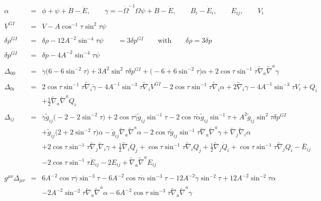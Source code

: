 \documentclass[10pt,letterpaper]{article}
\numberwithin{equation}{section}
\begin{document}
\begin{eqnarray}
\alpha  &=& \phi + \psi + \dot B - \ddot E,\qquad \gamma = - \dot\Omega^{-1}\Omega \psi + B - \dot E,
\qquad B_i - \dot E_i,\qquad E_{ij},\qquad V_i
\\ \nonumber\\
V^{GI} &=&V -  A\cos^{-1}\tau \sin^2\tau \psi 
\\ \nonumber\\
\delta \rho^{GI}&=&\delta \rho - 12 A^{-2} \sin^{-4}\tau \psi \qquad= 3\delta p^{GI}\qquad \text{with}\qquad \delta\rho=3\delta p
\\ \nonumber\\ 
\delta p^{GI}&=&\delta p  - 4 A^{-2}\sin^{-4}\tau \psi 
\\ \nonumber\\
\Delta_{00}&=& \dot{\gamma} \bigl(6 - 6 \sin^{-2}\tau\bigr) + 3 A^2 \sin^2\tau \delta p^{GI}{} + \bigl(-6 + 6 \sin^{-2}\tau\bigr) \alpha + 2 \cos\tau \sin^{-1}\tau \tilde{\nabla}_{a}\tilde{\nabla}^{a}\gamma 
\\  \nonumber\\ 
\Delta_{0i}&=& 2 \cos\tau \sin^{-1}\tau \tilde{\nabla}_{i}\dot{\gamma} - 4 A^{-1} \sin^{-3}\tau \tilde{\nabla}_{i}V^{GI}{} - 2 \cos\tau \sin^{-1}\tau \tilde{\nabla}_{i}\alpha + 2 \tilde{\nabla}_{i}\gamma -4 A^{-1} \sin^{-3}\tau V_{i} + Q_{i} \nonumber \\ 
&& + \tfrac{1}{2} \tilde{\nabla}_{a}\tilde{\nabla}^{a}Q_{i}
\\  \nonumber\\ 
\Delta_{ij}&=& \dot{\gamma} \tilde{g}_{ij} \bigl(-2 - 2 \sin^{-2}\tau\bigr) + 2 \cos\tau \overset{..}{\gamma} \tilde{g}_{ij} \sin^{-1}\tau - 2 \cos\tau \dot{\alpha} \tilde{g}_{ij} \sin^{-1}\tau + A^2 \tilde{g}_{ij} \sin^2\tau \delta p^{GI}{} \nonumber \\ 
&& + \tilde{g}_{ij} \bigl(2 + 2 \sin^{-2}\tau\bigr) \alpha -  \tilde{g}_{ij} \tilde{\nabla}_{a}\tilde{\nabla}^{a}\alpha - 2 \cos\tau \tilde{g}_{ij} \sin^{-1}\tau \tilde{\nabla}_{a}\tilde{\nabla}^{a}\gamma + \tilde{\nabla}_{j}\tilde{\nabla}_{i}\alpha \nonumber \\ 
&& + 2 \cos\tau \sin^{-1}\tau \tilde{\nabla}_{j}\tilde{\nabla}_{i}\gamma +\tfrac{1}{2} \tilde{\nabla}_{i}\dot{Q}_{j} + \cos\tau \sin^{-1}\tau \tilde{\nabla}_{i}Q_{j} + \tfrac{1}{2} \tilde{\nabla}_{j}\dot{Q}_{i} + \cos\tau \sin^{-1}\tau \tilde{\nabla}_{j}Q_{i}- \overset{..}{E}_{ij} \nonumber \\ 
&& - 2 \cos\tau \sin^{-1}\tau \dot{E}_{ij} - 2 E_{ij} + \tilde{\nabla}_{a}\tilde{\nabla}^{a}E_{ij}
\\  \nonumber\\ 
g^{\mu\nu}\Delta_{\mu\nu}&=& 6 A^{-2} \cos\tau \overset{..}{\gamma} \sin^{-3}\tau - 6 A^{-2} \cos\tau \dot{\alpha} \sin^{-3}\tau - 12 A^{-2} \dot{\gamma} \sin^{-2}\tau + 12 A^{-2} \sin^{-2}\tau \alpha \nonumber \\ 
&& - 2 A^{-2} \sin^{-2}\tau \tilde{\nabla}_{a}\tilde{\nabla}^{a}\alpha - 6 A^{-2} \cos\tau \sin^{-3}\tau \tilde{\nabla}_{a}\tilde{\nabla}^{a}\gamma 
\end{eqnarray}
\end{document}
